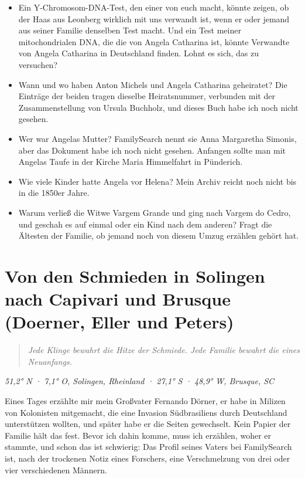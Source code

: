 \documentclass[
  ngerman,
  11pt,
  openany]{book}
\providecommand{\tightlist}{%
  \setlength{\itemsep}{0pt}\setlength{\parskip}{0pt}}
\begin{document}
\begin{itemize}
\tightlist
\item
  Ein Y-Chromosom-DNA-Test, den einer von euch macht, könnte zeigen, ob
  der Haas aus Leonberg wirklich mit uns verwandt ist, wenn er oder
  jemand aus seiner Familie denselben Test macht. Und ein Test meiner
  mitochondrialen DNA, die die von Angela Catharina ist, könnte
  Verwandte von Angela Catharina in Deutschland finden. Lohnt es sich,
  das zu versuchen?
\item
  Wann und wo haben Anton Michels und Angela Catharina geheiratet? Die
  Einträge der beiden tragen dieselbe Heiratsnummer, verbunden mit der
  Zusammenstellung von Ursula Buchholz, und dieses Buch habe ich noch
  nicht gesehen.
\item
  Wer war Angelas Mutter? FamilySearch nennt sie Anna Margaretha
  Simonis, aber das Dokument habe ich noch nicht gesehen. Anfangen
  sollte man mit Angelas Taufe in der Kirche Maria Himmelfahrt in
  Pünderich.
\item
  Wie viele Kinder hatte Angela vor Helena? Mein Archiv reicht noch
  nicht bis in die 1850er Jahre.
\item
  Warum verließ die Witwe Vargem Grande und ging nach Vargem do Cedro,
  und geschah es auf einmal oder ein Kind nach dem anderen? Fragt die
  Ältesten der Familie, ob jemand noch von diesem Umzug erzählen gehört
  hat.
\end{itemize}

\chapter{Von den Schmieden in Solingen nach Capivari und Brusque
(Doerner, Eller und Peters)}\label{cap-10}

\begin{quote}
\emph{Jede Klinge bewahrt die Hitze der Schmiede. Jede Familie bewahrt
die eines Neuanfangs.}
\end{quote}

\emph{51,2° N · 7,1° O, Solingen, Rheinland · 27,1° S · 48,9° W,
Brusque, SC}

Eines Tages erzählte mir mein Großvater Fernando Dörner, er habe in
Milizen von Kolonisten mitgemacht, die eine Invasion Südbrasiliens durch
Deutschland unterstützen wollten, und später habe er die Seiten
gewechselt. Kein Papier der Familie hält das fest. Bevor ich dahin
komme, muss ich erzählen, woher er stammte, und schon das ist schwierig:
Das Profil seines Vaters bei FamilySearch ist, nach der trockenen Notiz
eines Forschers, eine Verschmelzung von drei oder vier verschiedenen
Männern.
\end{document}
